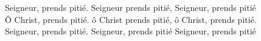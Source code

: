 Seigneur, prends pitié. Seigneur prends pitié, Seigneur, prends pitié\\
Ô Christ, prends pitié. ô Christ prends pitié, ô Christ, prends pitié.\\
Seigneur, prends pitié. Seigneur, prends pitié Seigneur, prends pitié
